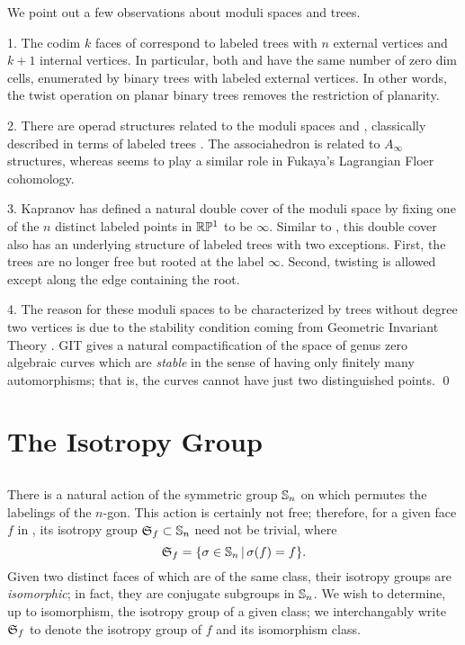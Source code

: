 \documentclass[10pt]{amsart}
\begin{document}
        \begin{rem} We point out a few observations about moduli spaces and trees.
        
        1. The codim $k$ faces of  correspond to labeled trees with $n$ external vertices and $k+1$ internal vertices. In particular, both  and  have the same number of zero dim cells, enumerated by binary trees with labeled external vertices.  In other words, the twist operation on planar binary trees removes the restriction of planarity.
        
        2. There are operad structures related to the moduli spaces  \cite{dev} and  \cite{gk}, classically  described in terms of labeled trees \cite[\S 1.4]{bv}. The associahedron is related to $A_\infty$ structures, whereas  seems to play a similar role in Fukaya's Lagrangian Floer cohomology.
        
        3. Kapranov \cite{kap} has defined a natural double cover of the moduli space  by fixing one of the $n$ distinct labeled points in ${\mathbb R} {\mathbb P}^1$ to be $\infty$. Similar to , this double cover also has an underlying structure of labeled trees \cite[\S 4.3]{dev} with two exceptions. First, the trees are no longer free but rooted at the label $\infty$.  Second, twisting is allowed except along the edge containing the root.
        
        4. The reason for these moduli spaces to be characterized by trees without degree two vertices is due to the stability condition coming from Geometric Invariant Theory \cite[\S 8]{git}.  GIT gives a natural compactification of the space of  genus zero algebraic curves which are {\em stable} in the sense of having only finitely many automorphisms; that is, the curves cannot have just two distinguished points.
        \qed
        
        \end{rem}
        
                                                
        \section {The Isotropy Group}
        
        \subsection{}
        There is a natural action of the symmetric group $\mathbb S_n$ on  which permutes the labelings of the $n$-gon. This action is certainly not free; therefore, for a given face $f$ in , its isotropy group ${\mathfrak S}_f \subset \mathbb S_n$ need not be trivial, where  
        $${\mathfrak S}_f = \{\sigma \in \mathbb S_n \,|\, \sigma(f) = f\}.$$
        Given two distinct faces of  which are of the same class, their isotropy groups are {\em isomorphic}; in fact, they are conjugate subgroups in $\mathbb S_n$.  We wish to determine, up to isomorphism, the isotropy group of a given class; we interchangably write ${\mathfrak S}_f$ to denote the isotropy group of $f$ and its isomorphism class.
        
\end{document}
